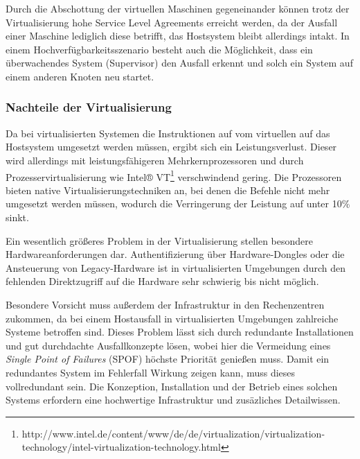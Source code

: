 Durch die Abschottung der virtuellen Maschinen gegeneinander können trotz der Virtualisierung hohe Service Level Agreements erreicht werden, da der Ausfall einer Maschine lediglich diese betrifft, das Hostsystem bleibt allerdings intakt.
In einem Hochverfügbarkeitsszenario besteht auch die Möglichkeit, dass ein überwachendes System (Supervisor) den Ausfall erkennt und solch ein System auf einem anderen Knoten neu startet.

\subsubsection{Nachteile der Virtualisierung \autocite[198]{Baun2009}}
Da bei virtualisierten Systemen die Instruktionen auf vom virtuellen auf das Hostsystem umgesetzt werden müssen, ergibt sich ein Leistungsverlust.
Dieser wird allerdings mit leistungsfähigeren Mehrkernprozessoren und durch Prozesservirtualisierung wie Intel® VT\footnote{http://www.intel.de/content/www/de/de/virtualization/virtualization-technology/intel-virtualization-technology.html} verschwindend gering.
Die Prozessoren bieten native Virtualisierungstechniken an, bei denen die Befehle nicht mehr umgesetzt werden müssen, wodurch die Verringerung der Leistung auf unter 10\% \autocite{Hardt2005} sinkt.

Ein wesentlich größeres Problem in der Virtualisierung stellen besondere Hardwareanforderungen dar.
Authentifizierung über Hardware-Dongles oder die Ansteuerung von Legacy-Hardware ist in virtualisierten Umgebungen durch den fehlenden Direktzugriff auf die Hardware sehr schwierig bis nicht möglich.

Besondere Vorsicht muss außerdem der Infrastruktur in den Rechenzentren zukommen, da bei einem Hostausfall in virtualisierten Umgebungen zahlreiche Systeme betroffen sind.
Dieses Problem lässt sich durch redundante Installationen und gut durchdachte Ausfallkonzepte lösen, wobei hier die Vermeidung eines \emph{Single Point of Failures} (SPOF) höchste Priorität genießen muss.
Damit ein redundantes System im Fehlerfall Wirkung zeigen kann, muss dieses vollredundant sein.
Die Konzeption, Installation und der Betrieb eines solchen Systems erfordern eine hochwertige Infrastruktur und zusäzliches Detailwissen.


